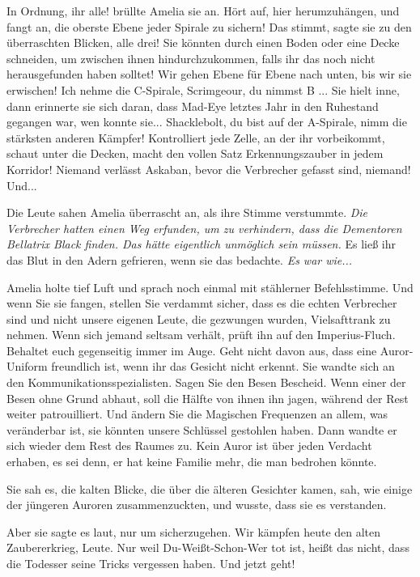 \glqq{}In Ordnung, ihr alle!\grqq{} brüllte Amelia sie an. \glqq{}Hört auf, hier
herumzuhängen, und fangt an, die oberste Ebene jeder Spirale zu sichern! Das
stimmt\grqq{}, sagte sie zu den überraschten Blicken, \glqq{}alle drei! Sie
könnten durch einen Boden oder eine Decke schneiden, um zwischen ihnen
hindurchzukommen, falls ihr das noch nicht herausgefunden haben solltet! Wir
gehen Ebene für Ebene nach unten, bis wir sie erwischen! Ich nehme die
C-Spirale, Scrimgeour, du nimmst B ...\grqq{} Sie hielt inne, dann erinnerte sie sich
daran, dass Mad-Eye letztes Jahr in den Ruhestand gegangen war, wen konnte
sie... \glqq{}Shacklebolt, du bist auf der A-Spirale, nimm die stärksten anderen
Kämpfer! Kontrolliert jede Zelle, an der ihr vorbeikommt, schaut unter die
Decken, macht den vollen Satz Erkennungszauber in jedem Korridor! Niemand
verlässt Askaban, bevor die Verbrecher gefasst sind, niemand! Und...\grqq{}

Die Leute sahen Amelia überrascht an, als ihre Stimme verstummte. \emph{Die
Verbrecher hatten einen Weg erfunden, um zu verhindern, dass die Dementoren
Bellatrix Black finden. Das hätte eigentlich unmöglich sein müssen.} Es ließ ihr
das Blut in den Adern gefrieren, wenn sie das bedachte. \emph{Es war wie...}

Amelia holte tief Luft und sprach noch einmal mit stählerner Befehlsstimme.
\glqq{}Und wenn Sie sie fangen, stellen Sie verdammt sicher, dass es die echten
Verbrecher sind und nicht unsere eigenen Leute, die gezwungen wurden,
Vielsafttrank zu nehmen. Wenn sich jemand seltsam verhält, prüft ihn auf den
Imperius-Fluch. Behaltet euch gegenseitig immer im Auge. Geht nicht davon aus,
dass eine Auror-Uniform freundlich ist, wenn ihr das Gesicht nicht erkennt.\grqq{} Sie
wandte sich an den Kommunikationsspezialisten. \glqq{}Sagen Sie den Besen
Bescheid. Wenn einer der Besen ohne Grund abhaut, soll die Hälfte von ihnen ihn
jagen, während der Rest weiter patrouilliert. Und ändern Sie die Magischen
Frequenzen an allem, was veränderbar ist, sie könnten unsere Schlüssel gestohlen
haben.\grqq{} Dann wandte er sich wieder dem Rest des Raumes zu. \glqq{}Kein Auror ist
über jeden Verdacht erhaben, es sei denn, er hat keine Familie mehr, die man
bedrohen könnte.\grqq{}

Sie sah es, die kalten Blicke, die über die älteren Gesichter kamen, sah, wie
einige der jüngeren Auroren zusammenzuckten, und wusste, dass sie es verstanden.

Aber sie sagte es laut, nur um sicherzugehen. \glqq{}Wir kämpfen heute den alten
Zaubererkrieg, Leute. Nur weil Du-Weißt-Schon-Wer tot ist, heißt das nicht, dass
die Todesser seine Tricks vergessen haben. Und jetzt geht!\grqq{}


